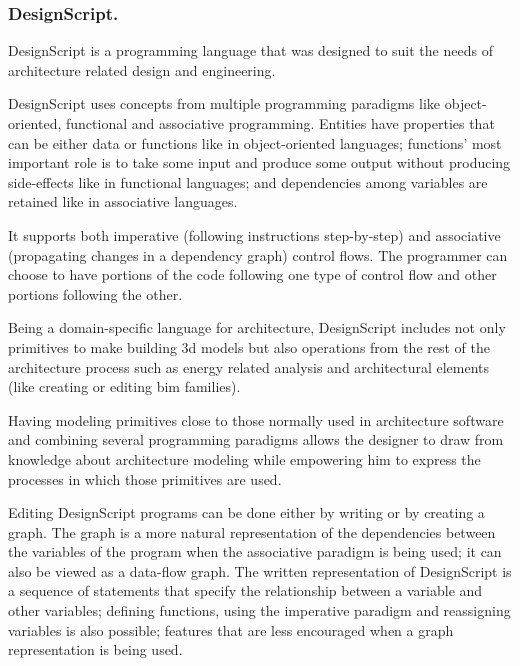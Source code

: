 \documentclass{./llncs2e/llncs}
\begin{document}
\subsubsection{DesignScript.}
	DesignScript\cite{aish2012designscript} is a programming language that was designed to suit the needs of architecture related design and engineering.
	
	DesignScript uses concepts from multiple programming paradigms like object-oriented, functional and associative programming. 
	Entities have properties that can be either data or functions like in object-oriented languages; functions' most important role is to take some input and produce some output without producing side-effects like in functional languages; and dependencies among variables are retained like in associative languages.
	
	It supports both imperative (following instructions step-by-step) and associative (propagating changes in a dependency graph) control flows. 
	The programmer can choose to have portions of the code following one type of control flow and other portions following the other.
	
	Being a domain-specific language for architecture, DesignScript includes not only primitives to make building 3d models but also operations from the rest of the architecture process such as energy related analysis and architectural elements (like creating or editing \ac{bim} families).
	
	Having modeling primitives close to those normally used in architecture software and combining several programming paradigms allows the designer to draw from knowledge about architecture modeling while empowering him to express the processes in which those primitives are used.
	
	Editing DesignScript programs can be done either by writing or by creating a graph. 
	The graph is a more natural representation of the dependencies between the variables of the program when the associative paradigm is being used; it can also be viewed as a data-flow graph. 
	The written representation of DesignScript is a sequence of statements that specify the relationship between a variable and other variables; defining functions, using the imperative paradigm and reassigning variables is also possible; features that are less encouraged when a graph representation is being used.
	
\end{document}
